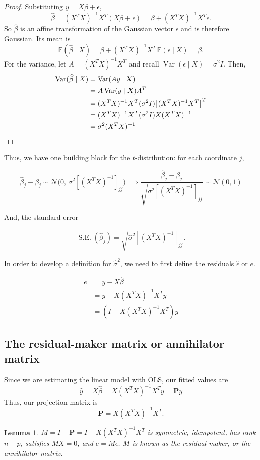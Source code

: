 \documentclass[11pt]{article}
\newtheorem{lemma}[theorem]{Lemma}
\theoremstyle{definition}
\begin{document}
\begin{proof}
    Substituting $y = X\beta + \epsilon$,
    $$\widehat{\beta} = (X^T X)^{-1} X^T (X\beta + \epsilon) = \beta + (X^T X)^{-1} X^T \epsilon.$$
    So $\widehat{\beta}$ is an affine transformation of the Gaussian vector
    $\epsilon$ and is therefore Gaussian. Its mean is
    $$\mathbb{E}(\widehat{\beta} \mid X) = \beta + (X^T X)^{-1} X^T \, \mathbb{E}(\epsilon \mid X) = \beta.$$
    For the variance, let $A = (X^T X)^{-1} X^T$ and recall $\operatorname{Var}(\epsilon \mid X) = \sigma^2 I$. Then,
\begin{align*}
    \operatorname{Var}(\widehat{\beta} \mid X) &= \operatorname{Var}(A y \mid X) \\
                                &= A \operatorname{Var}(y \mid X) A^T \\
                                &= (X^T X)^{-1} X^T (\sigma^2 I) \big[ (X^T X)^{-1} X^T\big]^T \\
                                &= (X^T X)^{-1} X^T (\sigma^2 I) X (X^T X)^{-1} \\
                                &= \sigma^2 (X^T X)^{-1} \qedhere
\end{align*}
\end{proof}

Thus, we have one building block for the $t$-distribution: for each
coordinate $j$,

$$ \widehat{\beta}_j - \beta_j \sim \mathcal{N}\big(0, \, \sigma^2 \left[(X^T X)^{-1}\right]_{jj}\big) \implies \frac{\widehat{\beta}_j - \beta_j}{\sqrt{\sigma^2 \left[(X^T X)^{-1}\right]_{jj}}} \sim \mathcal{N}(0, 1) $$

And, the standard error

$$\operatorname{S.E.}(\widehat{\beta}_j) = \sqrt{\widehat{\sigma}^2 \left[(X^T X)^{-1}\right]_{jj}}.$$

In order to develop a definition for $\widehat{\sigma}^2$, we need to first define the residuals $\widehat{\epsilon}$ or $e$.

\begin{align*}
    e &= y - X\widehat{\beta} \\
      &= y - X (X^T X)^{-1} X^T y \\
      &= (I - X (X^T X)^{-1} X^T) y
\end{align*}

\subsection{The residual-maker matrix or annihilator matrix}
Since we are estimating the linear model with OLS, our fitted values are 
$$\widehat{y} = X \widehat{\beta} = X (X^T X)^{-1} X^T y = \mathbf{P} y$$
Thus, our projection matrix is 
$$\mathbf{P} = X(X^T X)^{-1} X^T.$$
\begin{lemma}\label{lem:residual-maker}
    $M = I - \mathbf{P} = I - X(X^T X)^{-1} X^T$ is symmetric, idempotent, has rank $n-p$, satisfies $MX= 0$, and $e = M\epsilon$.
    $M$ is known as the residual-maker, or the annihilator matrix. 
\end{lemma}
\end{document}

